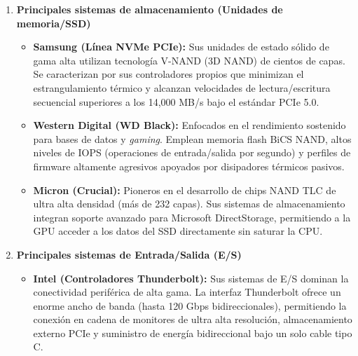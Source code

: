 \documentclass[10pt]{article}
\begin{document}
\begin{enumerate}
\begin{itemize}
        \item \textbf{Apple (Arquitectura Apple Silicon/ARM):} Implementa sistemas en chip (SoC) donde la CPU, GPU y la memoria unificada están en la misma matriz. Su principal característica es la eficiencia térmica y energética líder en la industria, ofreciendo un alto rendimiento por vatio y una integración nativa de motores neuronales (Neural Engine) para inteligencia artificial.
    \end{itemize}


    \item \textbf{Principales sistemas de almacenamiento (Unidades de memoria/SSD)}

    \begin{itemize}
        \item \textbf{Samsung (Línea NVMe PCIe):} Sus unidades de estado sólido de gama alta utilizan tecnología V-NAND (3D NAND) de cientos de capas. Se caracterizan por sus controladores propios que minimizan el estrangulamiento térmico y alcanzan velocidades de lectura/escritura secuencial superiores a los 14,000 MB/s bajo el estándar PCIe 5.0.

        \item \textbf{Western Digital (WD Black):} Enfocados en el rendimiento sostenido para bases de datos y \textit{gaming}. Emplean memoria flash BiCS NAND, altos niveles de IOPS (operaciones de entrada/salida por segundo) y perfiles de firmware altamente agresivos apoyados por disipadores térmicos pasivos.

        \item \textbf{Micron (Crucial):} Pioneros en el desarrollo de chips NAND TLC de ultra alta densidad (más de 232 capas). Sus sistemas de almacenamiento integran soporte avanzado para Microsoft DirectStorage, permitiendo a la GPU acceder a los datos del SSD directamente sin saturar la CPU.
    \end{itemize}


    \item \textbf{Principales sistemas de Entrada/Salida (E/S)}

    \begin{itemize}
        \item \textbf{Intel (Controladores Thunderbolt):} Sus sistemas de E/S dominan la conectividad periférica de alta gama. La interfaz Thunderbolt ofrece un enorme ancho de banda (hasta 120 Gbps bidireccionales), permitiendo la conexión en cadena de monitores de ultra alta resolución, almacenamiento externo PCIe y suministro de energía bidireccional bajo un solo cable tipo C.


\end{itemize}
\end{enumerate}
\end{document}

